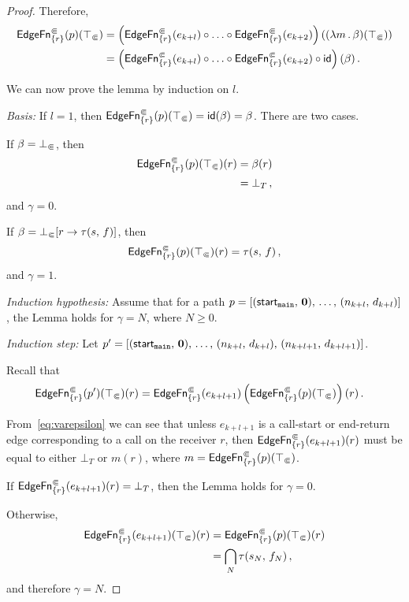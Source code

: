\begin{proof}
  Therefore,
  \begin{align}\label{eq:edgefnbeta}
    \textsf{EdgeFn}^\Subset_{\{r\}}(p)(\top_\Subset)
      &=\left(\textsf{EdgeFn}^\Subset_{\{r\}}(e_{k+l})\circ\ldots\circ
        \textsf{EdgeFn}^\Subset_{\{r\}}(e_{k+2})\right)((\lambda m\,.\,\beta)(\top_\Subset))\notag\\
      &=\left(\textsf{EdgeFn}^\Subset_{\{r\}}(e_{k+l})\circ\ldots\circ
        \textsf{EdgeFn}^\Subset_{\{r\}}(e_{k+2})\circ\textsf{id}\right)(\beta)\,.
  \end{align}

We can now prove the lemma by induction on $l$.

\textit{Basis:}
If $l=1$, then $\textsf{EdgeFn}^\Subset_{\{r\}}(p)(\top_\Subset)=\textsf{id}(\beta)=\beta$.
There are two cases.

If $\beta=\bot_\Subset$, then 
\begin{align*}
  \textsf{EdgeFn}^\Subset_{\{r\}}(p)(\top_\Subset)(r)&=\beta(r)\\&=\bot_T\,,
\end{align*} and $\gamma=0$.

If $\beta=\bot_\Subset[r\to\tau(s,\,f)]$, then 
\[
  \textsf{EdgeFn}^\Subset_{\{r\}}(p)(\top_\Subset)(r)=\tau(s,\,f)\,,
\]
and $\gamma=1$.

\textit{Induction hypothesis:}
Assume that for a path $p=[(\textsf{start}_\texttt{main},\,\mathbf0),\,\dots,\,(n_{k+l},\,d_{k+l})]$, the Lemma holds for $\gamma=N$, where $N\ge0$.

\textit{Induction step:}
Let $p'=[(\textsf{start}_\texttt{main},\,\mathbf0),\,\dots,\,(n_{k+l},\,d_{k+l}),\,(n_{k+l+1},\,d_{k+l+1})]$.

Recall that
\begin{align*}
  \textsf{EdgeFn}^\Subset_{\{r\}}(p')(\top_\Subset)(r)
  &=\textsf{EdgeFn}^\Subset_{\{r\}}(e_{k+l+1})\left(\textsf{EdgeFn}^\Subset_{\{r\}}(p)(\top_\Subset)\right)(r)\,.
\end{align*}

From~\eqref{eq:varepsilon} we can see that unless $e_{k+l+1}$ is a call-start or end-return edge corresponding to a call on the receiver $r$, then $\textsf{EdgeFn}^\Subset_{\{r\}}(e_{k+l+1})(r)$ must be equal to either $\bot_T$ or $m(r)$, where $m=\textsf{EdgeFn}^\Subset_{\{r\}}(p)(\top_\Subset)$. 

If $\textsf{EdgeFn}^\Subset_{\{r\}}(e_{k+l+1})(r)=\bot_T$, then the Lemma holds for $\gamma=0$. 

Otherwise,
\begin{align*}
  \textsf{EdgeFn}^\Subset_{\{r\}}(e_{k+l+1})(\top_\Subset)(r)&=\textsf{EdgeFn}^\Subset_{\{r\}}(p)(\top_\Subset)(r)\\
  &=\bigcap_{N}\tau(s_N,\,f_N)\,,
\end{align*}
and therefore $\gamma=N$.


\end{proof}
